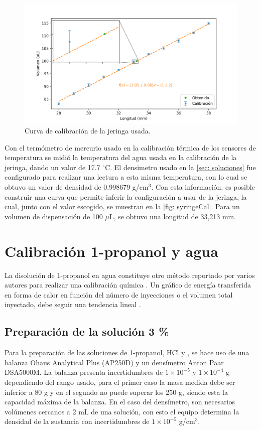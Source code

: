 	\begin{figure}[h!]
		\centering
		\includegraphics[width=\linewidth]{../Data/Syringe/syringe_cal.png}
		\caption{Curva de calibraci\'on de la jeringa usada.}
		\label{fig: syringeCal}
	\end{figure}
	
	Con el termómetro de mercurio usado en la calibración térmica de los sensores de temperatura se midió la temperatura del agua usada en la calibración de la jeringa, dando un valor de 17.7 $^\circ$C. El densimetro usado en la \autoref{sec: soluciones} fue configurado para realizar una lectura a esta misma temperatura, con lo cual se obtuvo un valor de densidad de 0.998679 g/cm$^3$. Con esta información, es posible construir una curva que permite inferir la configuración a usar de la jeringa, la cual, junto con el valor escogido, se muestran en la \autoref{fig: syringeCal}. Para un volumen de dispensación de 100 $\mu$L, se obtuvo una longitud de 33,213 mm.	

\section{Calibraci\'on 1-propanol y agua}
	La disoluci\'on de 1-propanol en agua constituye otro m\'etodo reportado por varios autores para realizar una calibraci\'on qu\'imica \cite{briggner1991test, nanoitc, demarse2011calibration, adao2012chemical}. Un gr\'afico de energ\'ia transferida en forma de calor en funci\'on del n\'umero de inyecciones o el volumen total inyectado, debe seguir una tendencia lineal \cite{demarse2011calibration, nanoitc, adao2012chemical}. 
	
\subsection{Preparaci\'on de la soluci\'on 3 \%}
	Para la preparaci\'on de las soluciones de 1-propanol, HCl y , se hace uso de una balanza Ohaus Analytical Plus (AP250D) y un dens\'imetro Anton Paar DSA5000M. La balanza presenta incertidumbres de $1\times10^{-5}$ y $1\times10^{-4}$ g dependiendo del rango usado, para el primer caso la masa medida debe ser inferior a 80 g y en el segundo no puede superar los 250 g, siendo esta la capacidad máxima de la balanza. En el caso del densímetro, son necesarios volúmenes cercanos a 2 mL de una soluci\'on, con esto el equipo determina la densidad de la sustancia con incertidumbres de $1\times10^{-5}$ g/cm$^{3}$.


